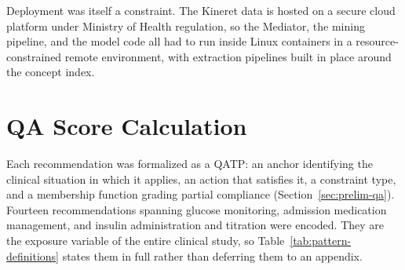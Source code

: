 Deployment was itself a constraint. The Kineret data is hosted on a secure cloud platform under Ministry of Health regulation, so the Mediator, the mining pipeline, and the model code all had to run inside Linux containers in a resource-constrained remote environment, with extraction pipelines built in place around the concept index.

\section{QA Score Calculation}

Each recommendation was formalized as a QATP: an anchor identifying the clinical situation in which it applies, an action that satisfies it, a constraint type, and a membership function grading partial compliance (Section~\ref{sec:prelim-qa}). Fourteen recommendations spanning glucose monitoring, admission medication management, and insulin administration and titration were encoded. They are the exposure variable of the entire clinical study, so Table~\ref{tab:pattern-definitions} states them in full rather than deferring them to an appendix.

